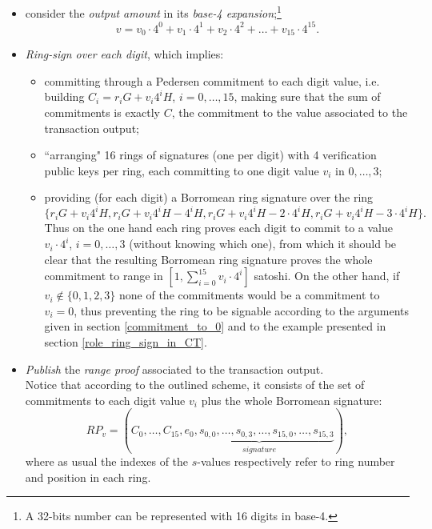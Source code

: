 \begin{itemize}[leftmargin=*]
    \item consider the \textit{output amount} in its \textit{base-4 expansion};\footnote{A 32-bits number can be represented with 16 digits in base-4.}
    \begin{equation*}
        v = v_0\cdot 4^0 + v_1\cdot 4^1 + v_2\cdot 4^2 + \dots + v_{15}\cdot 4^{15}.
    \end{equation*}
    \item \textit{Ring-sign over each digit}, which implies:
    \begin{itemize}
        \item committing through a Pedersen commitment to each digit value, i.e. building $C_i = r_iG + v_i4^iH$, $i=0,\dots,15$, making sure that the sum of commitments is exactly $C$, the commitment to the value associated to the transaction output;
        \item ``arranging" 16 rings of signatures (one per digit) with 4 verification public keys per ring, each committing to one digit value $v_i$ in $0,\dots,3$; 
        \item providing (for each digit) a Borromean ring signature over the ring
        \begin{equation*}
            \{r_iG + v_i4^iH, r_iG + v_i4^iH - 4^iH, r_iG + v_i4^iH - 2\cdot4^iH, r_iG + v_i4^iH - 3\cdot4^iH\}.
        \end{equation*}
        Thus on the one hand each ring proves each digit to commit to a value $v_i\cdot4^i$, $i=0,\dots,3$ (without knowing which one), from which it should be clear that the resulting Borromean ring signature proves the whole commitment to range in $[1, \sum\limits_{i=0}^{15}v_i\cdot4^i]$ satoshi. On the other hand, if $v_i \notin \{0,1,2,3\}$ none of the commitments would be a commitment to $v_i=0$, thus preventing the ring to be signable according to the arguments given in section \ref{commitment_to_0} and to the example presented in section \ref{role_ring_sign_in_CT}.
    \end{itemize}
    \item \textit{Publish} the \textit{range proof} associated to the transaction output.\\
    Notice that according to the outlined scheme, it consists of the set of commitments to each digit value $v_i$ plus the whole Borromean signature:
    \begin{equation*}
        RP_v = (C_0, \dots, C_{15}, \underbrace{e_0, s_{0,0}, \dots, s_{0,3}, \dots, s_{15,0}, \dots, s_{15,3}}_{signature}),
    \end{equation*}
    where as usual the indexes of the $s$-values respectively refer to ring number and position in each ring. 
\end{itemize}
